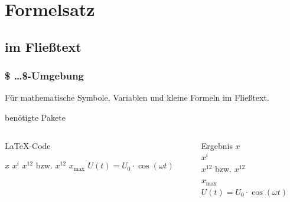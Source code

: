 \documentclass[9pt, mathserif]{beamer}
\begin{document}
\section{Formelsatz}
\subsection{im Fließtext}
\begin{frame}[fragile]
   \frametitle{\$ \dots \$-Umgebung}
   Für mathematische Symbole, Variablen und kleine Formeln im Fließtext. 

   \begin{block}{benötigte Pakete}
    \begin{lstverbatim}
        \usepackage{amsmath}
        \usepackage{mathtools}
        \usepackage{amssymb}
    \end{lstverbatim}
   \end{block}
    \begin{columns}[T]
        \begin{column}{0.6\textwidth}
            \begin{block}{\LaTeX-Code}
                \begin{lstverbatim}
                $x$ 
                $x^i$
                $x^12$ bzw. $x^{12}$ %
                $x_\text{max}$
                $U(t) = U_0 \cdot \cos(\omega t)$
                \end{lstverbatim}
            \end{block}
        \end{column}
        \begin{column}{0.35\textwidth}
            \begin{block}{Ergebnis}
                $x$  \\
                $x^i$ \\
                $x^12$ bzw. $x^{12}$ \\ 
                $x_\text{max}$ \\
                $U(t) = U_0 \cdot \cos(\omega t)$
            \end{block}
        \end{column}
    \end{columns}
\end{frame}
\end{document}
